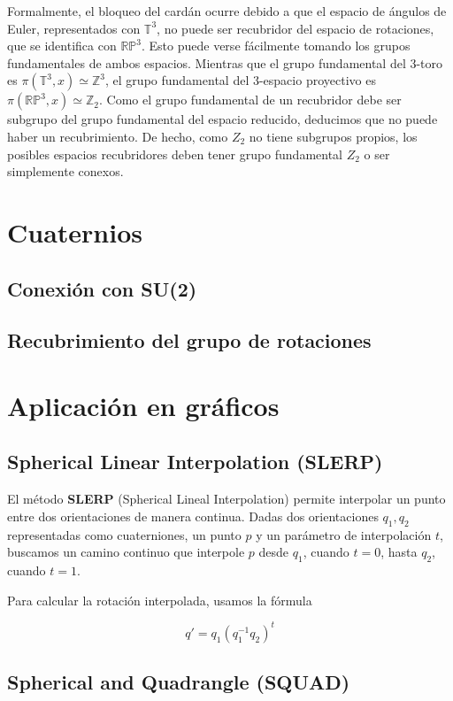 \documentclass{article}
\theoremstyle{plain}
\theoremstyle{definition}
\theoremstyle{remark}
\begin{document}
Formalmente, el bloqueo del cardán ocurre debido a que el espacio de ángulos de Euler, representados con $\mathbb T^3$,
no puede ser recubridor del espacio de rotaciones, que se identifica con $\mathbb{RP}^3$. Esto puede verse
fácilmente tomando los grupos fundamentales de ambos espacios. Mientras que el grupo fundamental del 3-toro es
$\pi(\mathbb T^3, x) \simeq \mathbb Z^3$, el grupo fundamental del 3-espacio proyectivo es $\pi(\mathbb{RP}^3, x)
\simeq \mathbb Z_2$. Como el grupo fundamental de un recubridor debe ser subgrupo del grupo fundamental del espacio
reducido, deducimos que no puede haber un recubrimiento. De hecho, como $Z_2$ no tiene subgrupos propios, los posibles
espacios recubridores deben tener grupo fundamental $Z_2$ o ser simplemente conexos.

\section{Cuaternios}
\subsection{Conexión con SU(2)}
\cite{gelfand63}

\subsection{Recubrimiento del grupo de rotaciones}


\section{Aplicación en gráficos}

\subsection{Spherical Linear Interpolation (SLERP)}
El método \textbf{SLERP} (Spherical Lineal Interpolation) permite interpolar
un punto entre dos orientaciones de manera continua. Dadas dos orientaciones
$q_1,q_2$ representadas como cuaterniones, un punto $p$ y un parámetro de
interpolación $t$, buscamos un camino continuo que interpole $p$ desde $q_1$,
cuando $t=0$, hasta $q_2$, cuando $t=1$.

Para calcular la rotación interpolada, usamos la fórmula

\[q' = q_1(q_1^{-1}q_2)^t\]

\subsection{Spherical and Quadrangle (SQUAD)}
\end{document}
